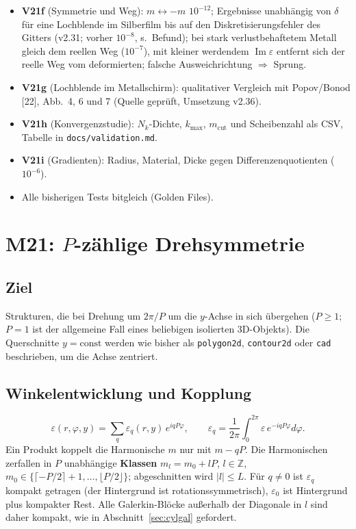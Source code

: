 \begin{itemize}[nosep]
  \item \textbf{V21f} (Symmetrie und Weg): $m\leftrightarrow-m$ $10^{-12}$; Ergebnisse unabhängig von $\delta$ für
        eine Lochblende im Silberfilm bis auf den Diskretisierungsfehler des Gitters (v2.31; vorher $10^{-8}$, s.\
        Befund); bei stark verlustbehaftetem Metall gleich dem reellen Weg ($10^{-7}$), mit kleiner werdendem
        $\operatorname{Im}\varepsilon$ entfernt sich der reelle Weg vom deformierten; falsche Ausweichrichtung
        $\Rightarrow$ Sprung.
  \item \textbf{V21g} (Lochblende im Metallschirm): qualitativer Vergleich mit Popov/Bonod [22], Abb.~4, 6 und 7
        (Quelle geprüft, Umsetzung v2.36).
  \item \textbf{V21h} (Konvergenzstudie): $N_k$-Dichte, $k_{\max}$, $m_{\text{cut}}$ und Scheibenzahl als CSV, Tabelle in
        \verb|docs/validation.md|.
  \item \textbf{V21i} (Gradienten): Radius, Material, Dicke gegen Differenzenquotienten ($10^{-6}$).
  \item Alle bisherigen Tests bitgleich (Golden Files).
\end{itemize}

\section{M21: $P$-zählige Drehsymmetrie}\label{sec:cylP}

\subsection{Ziel}
Strukturen, die bei Drehung um $2\pi/P$ um die $y$-Achse in sich übergehen ($P\ge1$; $P=1$ ist der allgemeine Fall
eines beliebigen isolierten 3D-Objekts). Die Querschnitte $y=\text{const}$ werden wie bisher als \verb|polygon2d|,
\verb|contour2d| oder \verb|cad| beschrieben, um die Achse zentriert.

\subsection{Winkelentwicklung und Kopplung}
\begin{equation}
  \varepsilon(r,\varphi,y)=\sum_q\varepsilon_q(r,y)\,e^{iqP\varphi},\qquad
  \varepsilon_q=\frac1{2\pi}\int_0^{2\pi}\varepsilon\,e^{-iqP\varphi}d\varphi .
  \label{eq:cylP_eps}
\end{equation}
Ein Produkt koppelt die Harmonische $m$ nur mit $m-qP$. Die Harmonischen zerfallen in $P$ unabhängige \textbf{Klassen}
$m_l=m_0+lP$, $l\in\mathbb Z$, $m_0\in\{\lceil-P/2\rceil+1,\dots,\lfloor P/2\rfloor\}$; abgeschnitten wird
$|l|\le L$. Für $q\ne0$ ist $\varepsilon_q$ kompakt getragen (der Hintergrund ist rotationssymmetrisch), $\varepsilon_0$
ist Hintergrund plus kompakter Rest. Alle Galerkin-Blöcke außerhalb der Diagonale in $l$ sind daher kompakt, wie in
Abschnitt~\ref{sec:cylgal} gefordert.


